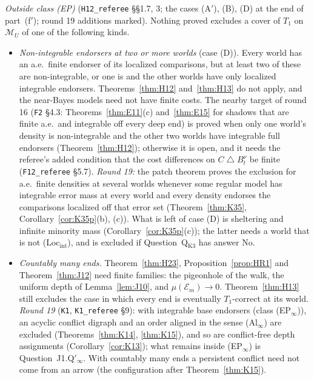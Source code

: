 \documentclass[11pt]{article}
\theoremstyle{definition}
\theoremstyle{remark}
\newcommand{\M}{\mathcal M}
\newcommand{\sd}{\mathbin{\triangle}}
\newcommand{\src}[1]{\texttt{#1}}
\begin{document}
\emph{Outside class (EP)} (\src{H12\_referee} \S\S1.7, 3; the cases (A$'$), (B), (D) at the end of part~(f$'$); round 19 additions marked). Nothing proved excludes a cover of $T_1$ on $\M_U$ of one of the following kinds.
\begin{itemize}[leftmargin=*]
\item \emph{Non-integrable endorsers at two or more worlds} (case (D)). Every world has an a.e.\ finite endorser of its localized comparisons, but at least two of these are non-integrable, or one is and the other worlds have only localized integrable endorsers. Theorems~\ref{thm:H12} and~\ref{thm:H13} do not apply, and the near-Bayes models need not have finite costs. The nearby target of round 16 (\src{F2} \S4.3: Theorems~\ref{thm:E11}(c) and~\ref{thm:E15} for shadows that are finite a.e.\ and integrable off every deep end) is proved when only one world's density is non-integrable and the other two worlds have integrable full endorsers (Theorem~\ref{thm:H12}); otherwise it is open, and it needs the referee's added condition that the cost differences on $C\sd B^\nu_t$ be finite (\src{F12\_referee} \S5.7). \emph{Round 19:} the patch theorem proves the exclusion for a.e.\ finite densities at several worlds whenever some regular model has integrable error mass at every world and every density endorses the comparisons localized off that error set (Theorem~\ref{thm:K35}, Corollary~\ref{cor:K35p}(b), (c)). What is left of case (D) is sheltering and infinite minority mass (Corollary~\ref{cor:K35p}(c)); the latter needs a world that is not (Loc$_{\mathrm{int}}$), and is excluded if Question~Q$_{\mathrm{K3}}$ has answer No.
\item \emph{Countably many ends.} Theorem~\ref{thm:H23}, Proposition~\ref{prop:HR1} and Theorem~\ref{thm:J12} need finite families: the pigeonhole of the walk, the uniform depth of Lemma~\ref{lem:J10}, and $\mu(\mathcal E_m)\to0$. Theorem~\ref{thm:H13} still excludes the case in which every end is eventually $T_1$-correct at its world. \emph{Round 19} (\src{K1}, \src{K1\_referee} \S9): with integrable base endorsers (class (EP$_\infty$)), an acyclic conflict digraph and an order aligned in the sense (Al$_\infty$) are excluded (Theorems~\ref{thm:K14}, \ref{thm:K15}), and so are conflict-free depth assignments (Corollary~\ref{cor:K13}); what remains inside (EP$_\infty$) is Question~J1.Q$'_\infty$. With countably many ends a persistent conflict need not come from an arrow (the configuration after Theorem~\ref{thm:K15}).

\end{itemize}
\end{document}
